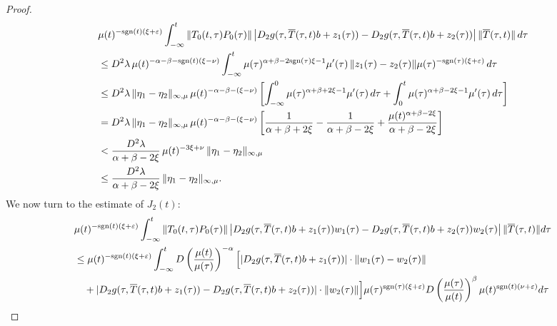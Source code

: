 \documentclass[9pt]{amsart}
\numberwithin{equation}{section}
\numberwithin{lemma}{section}
\begin{document}
\begin{proof}
\begin{align*}
&\mu(t)^{-\textnormal{sgn}(t)(\xi+\varepsilon)} 
\int_{-\infty}^{t} 
  \|T_0(t,\tau) P_0(\tau)\| 
  \left| D_2g(\tau, \overline{T}(\tau,t)b + z_1(\tau)) 
       - D_2g(\tau, \overline{T}(\tau,t)b + z_2(\tau)) \right| 
  \|\overline{T}(\tau,t)\| \, d\tau \\
%
&\leq D^2 \lambda \, \mu(t)^{-\alpha - \beta - \text{sgn}(t)(\xi - \nu)} 
     \int_{-\infty}^{t} 
     \mu(\tau)^{\alpha + \beta - 2\text{sgn}(\tau)\xi - 1} \mu'(\tau) \,
     \|z_1(\tau) - z_2(\tau)\| 
     \mu(\tau)^{-\text{sgn}(\tau)(\xi+\varepsilon)} \, d\tau \\
%
&\leq D^2 \lambda \, \|\eta_1 - \eta_2\|_{\infty,\mu} 
     \, \mu(t)^{-\alpha - \beta - (\xi - \nu)} 
     \left[
       \int_{-\infty}^{0} \mu(\tau)^{\alpha + \beta + 2\xi - 1} \mu'(\tau) \, d\tau
       + \int_{0}^{t} \mu(\tau)^{\alpha + \beta - 2\xi - 1} \mu'(\tau) \, d\tau
     \right] \\
%
&= D^2 \lambda \, \|\eta_1 - \eta_2\|_{\infty,\mu} 
     \, \mu(t)^{-\alpha - \beta - (\xi - \nu)} 
     \left[
       \frac{1}{\alpha + \beta + 2\xi} 
       - \frac{1}{\alpha + \beta - 2\xi} 
       + \frac{\mu(t)^{\alpha + \beta - 2\xi}}{\alpha + \beta - 2\xi}
     \right] \\
%
&< \frac{D^2 \lambda}{\alpha + \beta - 2\xi} 
    \, \mu(t)^{-3\xi + \nu} \, \|\eta_1 - \eta_2\|_{\infty,\mu} \\
%
&\leq \frac{D^2 \lambda}{\alpha + \beta - 2\xi} \, \|\eta_1 - \eta_2\|_{\infty,\mu}.
\end{align*}
We now turn to the estimate of \(J_2(t)\):
\small{\begin{align*}
&\mu(t)^{-\textnormal{sgn}(t)(\xi+\varepsilon)} 
\int_{-\infty}^{t} 
  \|T_0(t,\tau)P_0(\tau)\| 
  \left| 
    D_2g(\tau, \overline{T}(\tau,t)b + z_1(\tau)) w_1(\tau) 
    - D_2g(\tau, \overline{T}(\tau,t)b + z_2(\tau)) w_2(\tau) 
  \right| 
  \|\overline{T}(\tau,t)\| d\tau \\
%
&\leq \mu(t)^{-\textnormal{sgn}(t)(\xi+\varepsilon)} 
\int_{-\infty}^{t} 
  D \left( \frac{\mu(t)}{\mu(\tau)} \right)^{-\alpha} 
  \Big[ 
    |D_2g(\tau, \overline{T}(\tau,t)b + z_1(\tau))| \cdot \|w_1(\tau) - w_2(\tau)\| \\
&\quad + 
    |D_2g(\tau, \overline{T}(\tau,t)b + z_1(\tau)) 
    - D_2g(\tau, \overline{T}(\tau,t)b + z_2(\tau))| \cdot \|w_2(\tau)\| 
  \Big] 
  \mu(\tau)^{\text{sgn}(\tau)(\xi+\varepsilon)} 
  D \left( \frac{\mu(\tau)}{\mu(t)} \right)^{\beta} 
  \mu(t)^{\text{sgn}(t)(\nu+\varepsilon)} d\tau \\

\end{align*}}
\end{proof}
\end{document}
